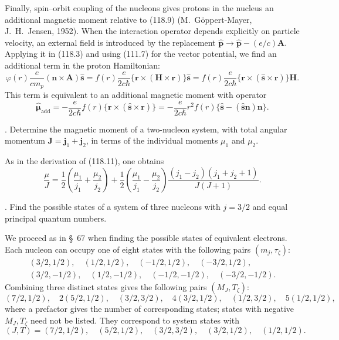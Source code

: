 Finally, spin--orbit coupling of the nucleons gives protons in the nucleus an
additional magnetic moment relative to (118.9) (M.~G\"oppert-Mayer,
J.~H.~Jensen, 1952). When the interaction operator depends explicitly on
particle velocity, an external field is introduced by the replacement
$\hat{\mathbf p}\to\hat{\mathbf p}-(e/c)\mathbf A$. Applying it in (118.3)
and using (111.7) for the vector potential, we find an additional term in the
proton Hamiltonian:
\[
 \varphi(r)\frac{e}{cm_p}(\mathbf n\times\mathbf A)\hat{\mathbf s}
 =f(r)\frac{e}{2c\hbar}\{\mathbf r\times(\mathbf H\times\mathbf r)\}
   \hat{\mathbf s}
 =f(r)\frac{e}{2c\hbar}\{\mathbf r\times(\hat{\mathbf s}\times\mathbf r)\}
   \mathbf H.
\]
This term is equivalent to an additional magnetic moment with operator
\begin{equation}
 \hat{\boldsymbol\mu}_{\mathrm{add}}
 =-\frac{e}{2c\hbar}f(r)\{\mathbf r\times(\hat{\mathbf s}\times\mathbf r)\}
 =-\frac{e}{2c\hbar}r^2f(r)
 \{\hat{\mathbf s}-(\hat{\mathbf s}\mathbf n)\mathbf n\}.
 \tag{118.14}
\end{equation}

. Determine the magnetic moment of a two-nucleon system, with total
angular momentum $\mathbf J=\mathbf j_1+\mathbf j_2$, in terms of the
individual moments $\mu_1$ and $\mu_2$.

\SolutionHeading As in the derivation of (118.11), one obtains
\[
 \frac\mu J=\frac12\left(\frac{\mu_1}{j_1}+\frac{\mu_2}{j_2}\right)
 +\frac12\left(\frac{\mu_1}{j_1}-\frac{\mu_2}{j_2}\right)
 \frac{(j_1-j_2)(j_1+j_2+1)}{J(J+1)}.
\]

. Find the possible states of a system of three nucleons with
$j=3/2$ and equal principal quantum numbers.

\SolutionHeading We proceed as in \S~67 when finding the possible states of
equivalent electrons. Each nucleon can occupy one of eight states with the
following pairs $(m_j,\tau_\zeta)$:
\[
 \begin{gathered}
 (3/2,1/2),\quad(1/2,1/2),\quad(-1/2,1/2),\quad(-3/2,1/2),\\
 (3/2,-1/2),\quad(1/2,-1/2),\quad(-1/2,-1/2),\quad(-3/2,-1/2).
 \end{gathered}
\]
Combining three distinct states gives the following pairs $(M_J,T_\zeta)$:
\[
 (7/2,1/2),\quad2(5/2,1/2),\quad(3/2,3/2),\quad4(3/2,1/2),
 \quad(1/2,3/2),\quad5(1/2,1/2),
\]
where a prefactor gives the number of corresponding states; states with
negative $M_J,T_\zeta$ need not be listed. They correspond to system states
with
\[
 (J,T)=(7/2,1/2),\quad(5/2,1/2),\quad(3/2,3/2),\quad
 (3/2,1/2),\quad(1/2,1/2).
\]

